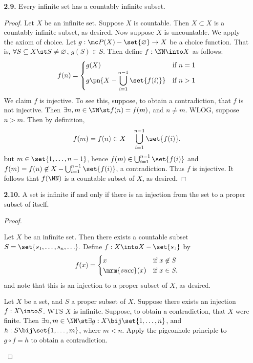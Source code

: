\documentclass{fkbook}
\newenvironment{problem}[1][Problem \thesection.]
{\begin{boxedminipage}{\linewidth}\textbf{#1.}}
{\end{boxedminipage}}
\begin{document}
\begin{problem}[2.9]
  Every infinite set has a countably infinite subset.
\end{problem}
\begin{proof}
  Let $X$ be an infinite set. Suppose $X$ is countable. Then $X \subset X$ is a
  countably infinite subset, as desired. Now suppose $X$ is uncountable. We
  apply the axiom of choice. Let $g : \mc P(X) - \set{\varnothing} \to X$ be a
  choice function. That is, $\forall S \subseteq X \st S \neq \varnothing$,
  $g(S) \in S$. Then define $f : \NN \into X$ as follows:
  \[
    f(n) =
    \begin{cases}
      g(X) & \text{if } n = 1 \\
      \displaystyle g\pn{X - \bigcup_{i=1}^{n-1} \set{f(i)}} & \text{if } n > 1
    \end{cases}
  \]
  We claim $f$ is injective. To see this, suppose, to obtain a contradiction,
  that $f$ is not injective. Then $\exists n,m \in \NN \st f(n) = f(m)$, and $n
  \neq m$. WLOG, suppose $n > m$. Then by definition,
  \[
    f(m) = f(n) \in X - \bigcup_{i=1}^{n-1} \set{f(i)}.
  \]
  but $m \in \set{1, \ldots, n-1}$, hence $f(m) \in \bigcup_{i=1}^{n=1}
  \set{f(i)}$ and $f(m) = f(n) \not \in X - \bigcup_{i=1}^{n-1} \set{f(i)}$, a
  contradiction. Thus $f$ is injective. It follows that $f(\NN)$ is a countable
  subset of $X$, as desired.
\end{proof}
\begin{problem}[2.10]
  A set is infinite if and only if there is an injection from the set to a
  proper subset of itself.
\end{problem}
\begin{proof}~
  \begin{iffproof}
    \item Let $X$ be an infinite set. Then there exists a countable subset $S =
      \set{s_1, \ldots, s_n, \ldots}$. Define $f : X \into X - \set{s_1}$ by
      \[
        f(x) =
        \begin{cases}
          x & \text{if } x \not \in S \\
          \mrm{succ}(x) & \text{if } x \in S.
        \end{cases}
      \]
      and note that this is an injection to a proper subset of $X$, as desired.
    \item Let $X$ be a set, and $S$ a proper subset of $X$. Suppose there exists
      an injection $f : X \into S$. WTS $X$ is infinite. Suppose, to obtain a
      contradiction, that $X$ were finite. Then $\exists n,m \in \NN \st \exists
      g : X \bij \set{1, \ldots, n}$, and $h : S \bij \set{1, \ldots, m}$, where
      $m < n$. Apply the pigeonhole principle to $g \circ f = h$ to obtain a
      contradiction.
  \end{iffproof}
\end{proof}
\end{document}
